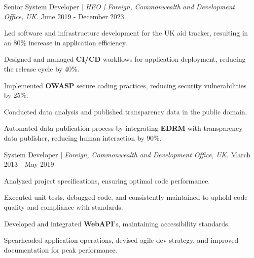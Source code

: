 
\begin{cventries2}


  \cventrynew
    {Senior System Developer | \textnormal{\textit{HEO | Foreign, Commonwealth and Development Office, UK.}}} %
    {June 2019 - December 2023} %
    {
      \begin{cvitems} %
        \item {Led software and infrastructure development for the UK aid tracker, resulting in an 80\% increase in application efficiency.}
        \item {Designed and managed {\bf CI/CD} workflows for application deployment, reducing the release cycle by 40\%.}
        \item {Implemented {\bf OWASP} secure coding practices, reducing security vulnerabilities by 25\%.}   
        \item {Conducted data analysis and published transparency data in the public domain.}
        \item {Automated data publication process by integrating {\bf EDRM} with transparency data publisher, reducing human interaction by 90\%.}
      \end{cvitems}
    }

  \cventrynew
 {System Developer | \textnormal {\textit{Foreign, Commonwealth and Development Office, UK.}}} %
    {March 2013 - May 2019} %
    {
      \begin{cvitems} %
        \item {Analyzed project specifications, ensuring optimal code performance.} 
        \item {Executed unit tests, debugged code, and consistently maintained to uphold code quality and compliance with standards.}
        \item {Developed and integrated {\bf WebAPI}’s, maintaining accessibility standards.}
        \item {Spearheaded application operations, devised agile dev strategy, and improved documentation for peak performance.}
      \end{cvitems}
    }


\end{cventries2}
